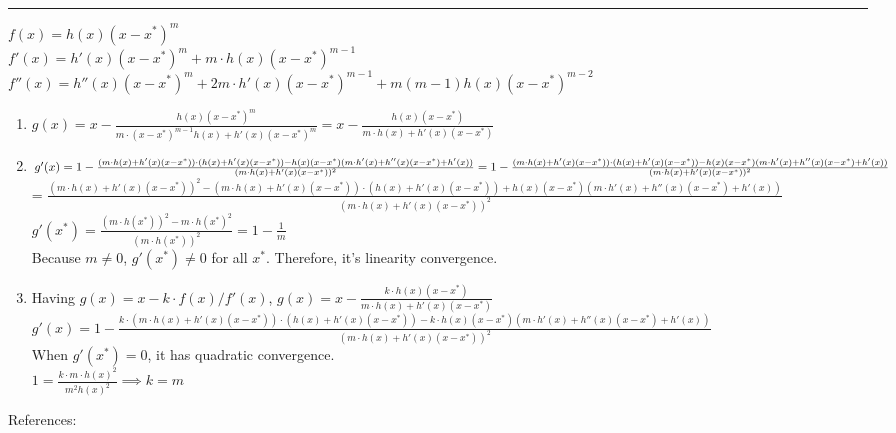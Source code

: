 \documentclass[11pt]{article}
\begin{document}





\begin{quote}

\end{quote}
\hrule


\begin{solution}
\item  
    $f(x) = h(x)(x - x^*)^{m}$\\
    $f'(x) = h'(x)(x - x^*)^{m} + m\cdot h(x)(x - x^*)^{m-1}$\\
    $f''(x) = h''(x)(x-x^*)^m + 2m\cdot h'(x)(x-x^*)^{m-1} + m(m-1)h(x)(x-x^*)^{m-2}$
        \begin{enumerate}
            \item $g(x) = x - \frac{h(x)(x - x^*)^{m}}{m \cdot (x - x^*)^{m-1}h(x) + h'(x)(x - x^*)^{m}} = x - \frac{h(x)(x - x^*)}{m \cdot h(x) + h'(x)(x - x^*)}$

            \item $g'(x) = 1 - \frac{(m \cdot h(x) + h'(x)(x - x^*)) \cdot (h(x) + h'(x)(x-x^*))- h(x)(x-x^*)(m \cdot h'(x) + h''(x)(x-x^*) + h'(x))}{(m \cdot h(x) + h'(x)(x - x^*))^2} \\
            = 1 - \frac{(m \cdot h(x) + h'(x)(x - x^*)) \cdot (h(x) + h'(x)(x-x^*))- h(x)(x-x^*)(m \cdot h'(x) + h''(x)(x-x^*) + h'(x))}{(m \cdot h(x) + h'(x)(x - x^*))^2}$\\
            = $\frac{(m \cdot h(x) + h'(x)(x - x^*))^2 - (m \cdot h(x) + h'(x)(x - x^*)) \cdot (h(x) + h'(x)(x-x^*))+ h(x)(x-x^*)(m \cdot h'(x) + h''(x)(x-x^*) + h'(x))}{(m \cdot h(x) + h'(x)(x - x^*))^2}$\\
            
            $g'(x^*) = \frac{(m\cdot h(x^*))^2 - m\cdot h(x^*)^2}{(m\cdot h(x^*))^2} = 1 - \frac{1}{m}$
            \\
            Because $m \neq 0$, $g'(x^*) \neq 0$ for all $x^*$. Therefore, it's linearity convergence. 
            
            \item Having $g(x) = x - k\cdot f(x)/f'(x)$, $g(x) = x - \frac{k\cdot h(x)(x - x^*)}{ m \cdot h(x) + h'(x)(x - x^*)} $\\
            
            $g'(x) = 1 - \frac{k \cdot (m \cdot h(x) + h'(x)(x - x^*)) \cdot (h(x) + h'(x)(x-x^*))- k \cdot h(x)(x-x^*)(m \cdot h'(x) + h''(x)(x-x^*) + h'(x))}{(m \cdot h(x) + h'(x)(x - x^*))^2}$\\
            
            When $g'(x^*) = 0$, it has quadratic convergence.\\
            $1 =  \frac{k \cdot m \cdot h(x)^2}{m^2h(x)^2} \implies k = m$\\
            
            
            
        \end{enumerate}
    
\end{solution}
References: \\ 
\end{document}

